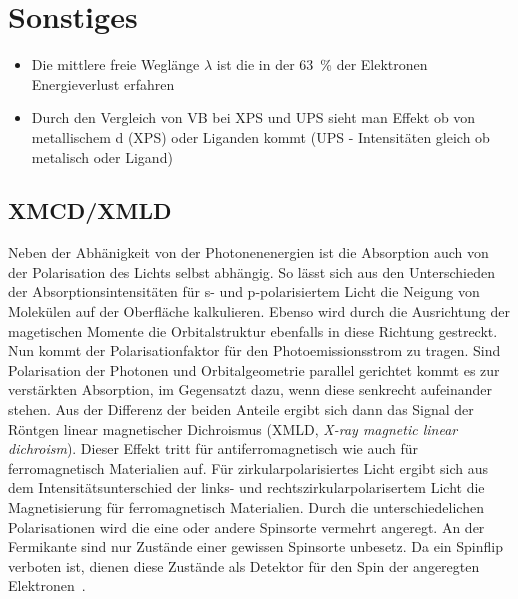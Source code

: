             \section{Sonstiges}
            \begin{itemize}
                \item Die mittlere freie Weglänge $\lambda$ ist die in der \SI{63}{\percent} der Elektronen Energieverlust erfahren \cite{vickerman_surface_2009}
                \item Durch den Vergleich von VB bei XPS und UPS sieht man Effekt ob von metallischem d (XPS) oder Liganden kommt (UPS - Intensitäten gleich ob metalisch oder Ligand) \cite{FeO_44}
            \end{itemize}

            \subsection{XMCD/XMLD}
            Neben der Abhänigkeit von der Photonenenergien ist die Absorption auch von der Polarisation des Lichts selbst abhängig.
            So lässt sich aus den Unterschieden der Absorptionsintensitäten für s- und p-polarisiertem Licht die Neigung von Molekülen auf der Oberfläche kalkulieren\cite{floreano_periodic_2008}.
            Ebenso wird durch die Ausrichtung der magetischen Momente die Orbitalstruktur ebenfalls in diese Richtung gestreckt.
            Nun kommt der Polarisationfaktor für den Photoemissionsstrom zu tragen.
            Sind Polarisation der Photonen und Orbitalgeometrie parallel gerichtet kommt es zur verstärkten Absorption, im Gegensatzt dazu, wenn diese senkrecht aufeinander stehen.
            Aus der Differenz der beiden Anteile ergibt sich dann das Signal der Röntgen linear magnetischer Dichroismus (XMLD, \textit{X-ray magnetic linear dichroism}).
            Dieser Effekt tritt für antiferromagnetisch wie auch für ferromagnetisch Materialien auf.
            Für zirkularpolarisiertes Licht ergibt sich aus dem Intensitätsunterschied der links- und rechtszirkularpolarisertem Licht die Magnetisierung für ferromagnetisch Materialien.
            Durch die unterschiedelichen Polarisationen wird die eine oder andere Spinsorte vermehrt angeregt.
            An der Fermikante sind nur Zustände einer gewissen Spinsorte unbesetz.
            Da ein Spinflip verboten ist, dienen diese Zustände als Detektor für den Spin der angeregten Elektronen~\cite{stohr_magnetism_2006}.

